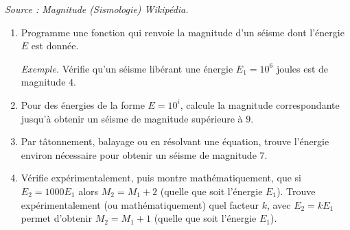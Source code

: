 \documentclass[11pt,class=report,crop=false]{standalone}
\begin{document}
\begin{activite}
{\begin{center}
\smallskip

\emph{Source : \og{}Magnitude (Sismologie)\fg{}  Wikipédia.}
\end{center}  
}
  \begin{enumerate}
    \item Programme une fonction  qui renvoie la magnitude d'un séisme dont l'énergie $E$ est donnée.
    
    \emph{Exemple.} Vérifie qu'un séisme libérant une énergie $E_1 = 10^6$ joules est de magnitude $4$.
    
    \item Pour des énergies de la forme $E = 10^i$, calcule la magnitude correspondante jusqu'à obtenir un séisme de magnitude supérieure à $9$.
    
    \item Par tâtonnement, balayage ou en résolvant une équation, trouve l'énergie environ nécessaire pour obtenir un séisme de magnitude $7$.
    
    \item Vérifie expérimentalement, puis montre mathématiquement, que si $E_2 = 1000 E_1$ alors 
    $M_2 = M_1 + 2$ (quelle que soit l'énergie $E_1$).
    Trouve expérimentalement (ou mathématiquement) quel facteur $k$, avec $E_2 = k E_1$ 
    permet d'obtenir $M_2 = M_1 + 1$ (quelle que soit l'énergie $E_1$).
    
  \end{enumerate}
 
\end{activite}

\end{document}
